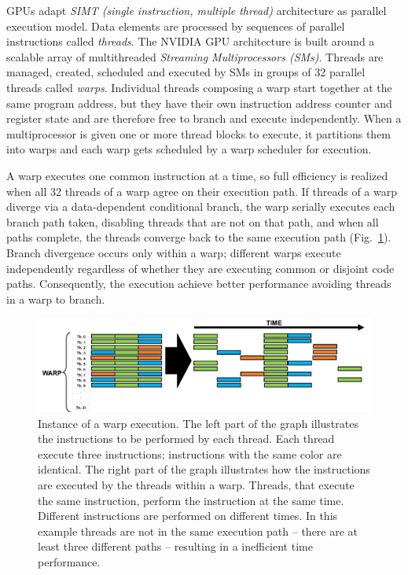 GPUs adapt \textit{SIMT (single instruction, multiple thread)} architecture as parallel execution model. Data elements are processed by sequences of parallel instructions called \textit{threads}. The NVIDIA GPU architecture is built around a scalable array of multithreaded \textit{Streaming Multiprocessors (SMs)}. Threads are managed, created, scheduled and executed by SMs in groups of 32 parallel threads called \textit{warps}. Individual threads composing a warp start together at the same program address, but they have their own instruction address counter and register state and are therefore free to branch and execute independently. When a multiprocessor is given one or more thread blocks to execute, it partitions them into warps and each warp gets scheduled by a warp scheduler for execution. 

A warp executes one common instruction at a time, so full efficiency is realized when all 32 threads of a warp agree on their execution path. If threads of a warp diverge via a data-dependent conditional branch, the warp serially executes each branch path taken, disabling threads that are not on that path, and when all paths complete, the threads converge back to the same execution path (Fig.~\ref{fig:warp-instruction}). Branch divergence occurs only within a warp; different warps execute independently regardless of whether they are executing common or disjoint code paths. Consequently, the execution achieve better performance avoiding threads in a warp to branch.
\begin{figure}
   \centering
   \includegraphics[width=14cm]{Figs/Warp_instruction.png}
   \caption{Instance of a warp execution. The left part of the graph illustrates the instructions to be performed by each thread. Each thread execute three instructions; instructions with the same color are identical. The right part of the graph illustrates how the instructions are executed by the threads within a warp. Threads, that execute the same instruction, perform the instruction at the same time. Different instructions are performed on different times. In this example threads are not in the same execution path -- there are at least three different paths -- resulting in a inefficient time performance.} \label{fig:warp-instruction}
\end{figure}

